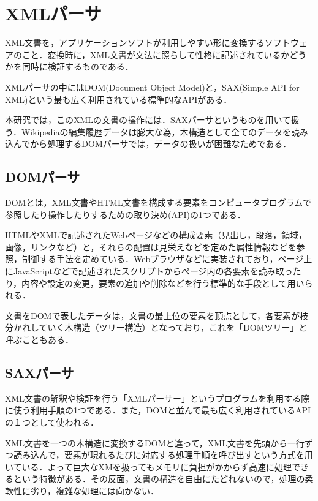 \section{XMLパーサ}

XML文書を，アプリケーションソフトが利用しやすい形に変換するソフトウェアのこと．変換時に，XML文書が文法に照らして性格に記述されているかどうかを同時に検証するものである．

XMLパーサの中にはDOM(Document Object Model)と，SAX(Simple API for XML)という最も広く利用されている標準的なAPIがある．

本研究では，このXMLの文書の操作には．SAXパーサというものを用いて扱う．Wikipediaの編集履歴データは膨大な為，木構造として全てのデータを読み込んでから処理するDOMパーサでは，データの扱いが困難なためである．



\subsection{DOMパーサ}

DOMとは，XML文書やHTML文書を構成する要素をコンピュータプログラムで参照したり操作したりするための取り決め(API)の1つである．

HTMLやXMLで記述されたWebページなどの構成要素（見出し，段落，領域，画像，リンクなど）と，それらの配置は見栄えなどを定めた属性情報などを参照，制御する手法を定めている．Webブラウザなどに実装されており，ページ上にJavaScriptなどで記述されたスクリプトからページ内の各要素を読み取ったり，内容や設定の変更，要素の追加や削除などを行う標準的な手段として用いられる．

文書をDOMで表したデータは，文書の最上位の要素を頂点として，各要素が枝分かれしていく木構造（ツリー構造）となっており，これを「DOMツリー」と呼ぶこともある．\cite{DOM1}



\subsection{SAXパーサ}

XML文書の解釈や検証を行う「XMLパーサー」というプログラムを利用する際に使う利用手順の1つである．また，DOMと並んで最も広く利用されているAPIの１つとして使われる．

XML文書を一つの木構造に変換するDOMと違って，XML文書を先頭から一行ずつ読み込んで，要素が現れるたびに対応する処理手順を呼び出すという方式を用いている．よって巨大なXMを扱ってもメモリに負担がかからず高速に処理できるという特徴がある．その反面，文書の構造を自由にたどれないので，処理の柔軟性に劣り，複雑な処理には向かない．\cite{SAX1}




